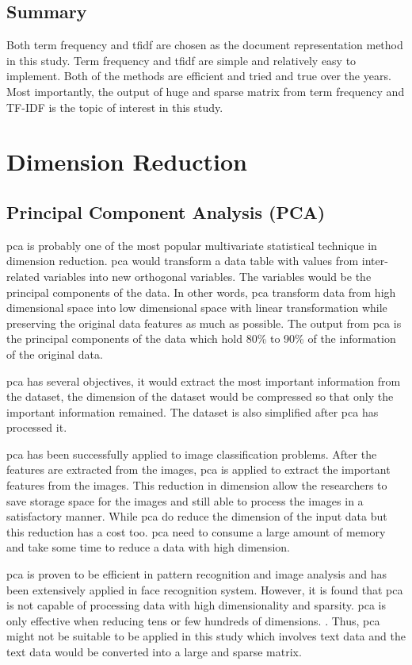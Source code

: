 \subsection{Summary}
Both term frequency and \ac{tfidf} are chosen as the document representation method in this study. Term frequency and \ac{tfidf} are simple and relatively easy to implement. Both of the methods are efficient and tried and true over the years. Most importantly, the output of huge and sparse matrix from term frequency and TF-IDF is the topic of interest in this study.\\


\section{Dimension Reduction}
\subsection{Principal Component Analysis (PCA)}
\Ac{pca} is probably one of the most popular multivariate statistical technique in dimension reduction. \Ac{pca} would transform a data table with values from inter-related variables into new orthogonal variables. The variables would be the principal components of the data. In other words, \ac{pca} transform data from high dimensional space into low dimensional space with linear transformation while preserving the original data features as much as possible. \cite{pcaImage} The output from \ac{pca} is the principal components of the data which hold 80\% to 90\% of the information of the original data.

\Ac{pca} has several objectives, it would extract the most important information from the dataset, the dimension of the dataset would be compressed so that only the important information remained. The dataset is also simplified after \ac{pca} has processed it. \cite{pcaObj}

\Ac{pca} has been successfully applied to image classification problems. After the features are extracted from the images, \ac{pca} is applied to extract the important features from the images. This reduction in dimension allow the researchers to save storage space for the images and still able to process the images in a satisfactory manner. While \ac{pca} do reduce the dimension of the input data but this reduction has a cost too. \Ac{pca} need to consume a large amount of memory and take some time to reduce a data with high dimension. \cite{pcaImage}

\Ac{pca} is proven to be efficient in pattern recognition and image analysis and has been extensively applied in face recognition system. However, it is found that \ac{pca} is not capable of processing data with high dimensionality and sparsity. \ac{pca} is only effective when reducing tens or few hundreds of dimensions. \cite{dimRedCat}. Thus, \ac{pca} might not be suitable to be applied in this study which involves text data and the text data would be converted into a large and sparse matrix.\\

